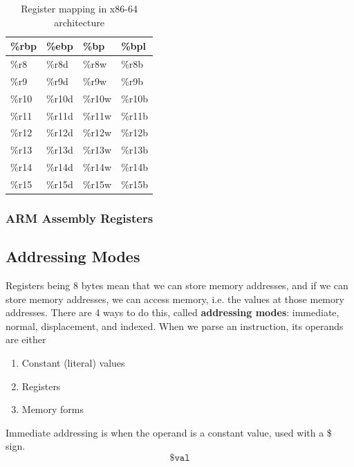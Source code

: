 \documentclass{article}
\begin{document}
\begin{definition}
\begin{table}[H]
\begin{tabular}{|l|l|l|l|}
          \%rbp & \%ebp & \%bp & \%bpl \\ \hline
          \%r8 & \%r8d & \%r8w & \%r8b \\ \hline
          \%r9 & \%r9d & \%r9w & \%r9b \\ \hline
          \%r10 & \%r10d & \%r10w & \%r10b \\ \hline
          \%r11 & \%r11d & \%r11w & \%r11b \\ \hline
          \%r12 & \%r12d & \%r12w & \%r12b \\ \hline
          \%r13 & \%r13d & \%r13w & \%r13b \\ \hline
          \%r14 & \%r14d & \%r14w & \%r14b \\ \hline
          \%r15 & \%r15d & \%r15w & \%r15b \\ \hline
          \end{tabular}
          \caption{Register mapping in x86-64 architecture}
          \label{table:register_mapping}
        \end{table}
      \end{definition}

    \subsubsection{ARM Assembly Registers}

  \subsection{Addressing Modes}

    Registers being 8 bytes mean that we can store memory addresses, and if we can store memory addresses, we can access memory, i.e. the values at those memory addresses. There are 4 ways to do this, called \textbf{addressing modes}: immediate, normal, displacement, and indexed. When we parse an instruction, its operands are either 
    \begin{enumerate}
      \item Constant (literal) values 
      \item Registers 
      \item Memory forms
    \end{enumerate}

    \begin{definition}
      Immediate addressing is when the operand is a constant value, used with a \$ sign. 
      \begin{equation}
        \texttt{\$val}
      \end{equation}
    \end{definition}
\end{document}
